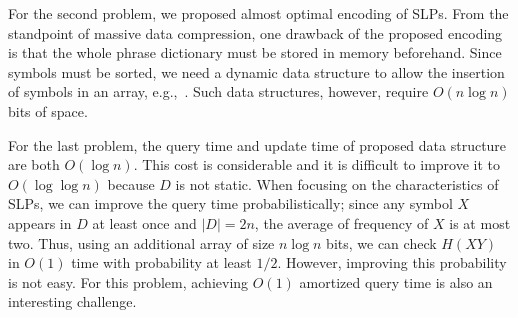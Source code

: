 \documentclass[10pt]{llncs}
\begin{document}
For the second problem, we proposed almost optimal encoding of SLPs.
From the standpoint of massive data compression,
one drawback of the proposed encoding is that
the whole phrase dictionary must be stored in memory beforehand.
Since symbols must be sorted, we need a dynamic data structure
to allow the insertion of symbols in an array, e.g.,~\cite{Jansson2012}.
Such data structures, however, require $O(n\log n)$ bits of space.

For the last problem, the query time and update time of proposed 
data structure are both $O(\log n)$.
This cost is considerable and it is difficult to improve it
to $O(\log\log n)$ because $D$ is not static.
When focusing on the characteristics of SLPs, 
we can improve the query time probabilistically;
since any symbol $X$ appears in $D$ at least once and $|D|=2n$,
the average of frequency of $X$ is at most two.
Thus, using an additional array of size $n\log n$ bits,
we can check $H(XY)$ in $O(1)$ time with probability at least $1/2$.
However, improving this probability is not easy.
For this problem, achieving $O(1)$ amortized query time is also an interesting challenge.






{\small

}
\end{document}
